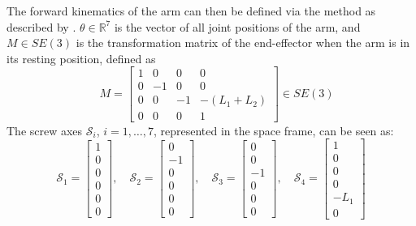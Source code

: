 \documentclass[a4paper,11pt]{article}
\begin{document}
The forward kinematics of the arm can then be defined via the method as described by \textcite[\S~4.1]{modernrobotics}. $\theta \in \mathbb{R}^{7}$ is the vector of all joint positions of the arm, and $M \in SE(3)$ is the transformation matrix of the end-effector when the arm is in its resting position, defined as
\begin{equation*}
    \quad M = \begin{bmatrix} 
        1 & 0 & 0 & 0 \\ 
        0 & -1 & 0 & 0 \\ 
        0 & 0 & -1 & -(L_{1}+L_{2}) \\
        0 & 0 & 0 & 1 
    \end{bmatrix} \in SE(3)
\end{equation*}
The screw axes $\mathcal{S}_{i}$, $i=1,\dots,7$, represented in the space frame, can be seen as:
\begin{equation*}
    \mathcal{S}_{1} = \begin{bmatrix}
        1 \\ 0 \\ 0 \\ 
        0 \\ 0 \\ 0
    \end{bmatrix}
    ,\quad
    \mathcal{S}_{2} = \begin{bmatrix}
        0 \\ -1 \\ 0 \\ 
        0 \\ 0 \\ 0
    \end{bmatrix}
    ,\quad
    \mathcal{S}_{3} = \begin{bmatrix}
        0 \\ 0 \\ -1 \\ 
        0 \\ 0 \\ 0
    \end{bmatrix}
    ,\quad
    \mathcal{S}_{4} = \begin{bmatrix}
        1 \\ 0 \\ 0 \\ 
        0 \\ -L_{1} \\ 0
    \end{bmatrix}
\end{equation*}
\end{document}
